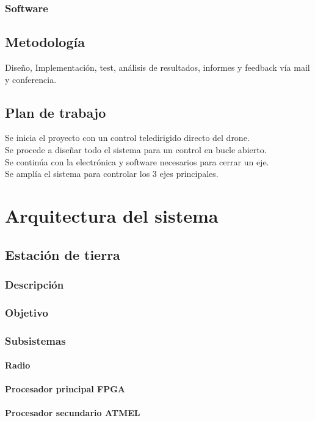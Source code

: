 \documentclass[10pt]{article}
\begin{document}
		\subsubsection{Software}
	\subsection{Metodología}
	Diseño, Implementación, test, análisis de resultados, informes y feedback vía mail y conferencia.
	\subsection{Plan de trabajo}
	Se inicia el proyecto con un control teledirigido directo del drone.\\
	Se procede a diseñar todo el sistema para un control en bucle abierto.\\
	Se continúa con la electrónica y software necesarios para cerrar un eje.\\
	Se amplía el sistema para controlar los 3 ejes principales.
			
\section{Arquitectura del sistema}
	\subsection{Estación de tierra}
		\subsubsection{Descripción}
		\subsubsection{Objetivo}
		\subsubsection{Subsistemas}
			\paragraph{Radio}
			\paragraph{Procesador principal FPGA}
			\paragraph{Procesador secundario ATMEL}
\end{document}

